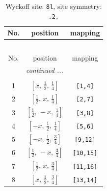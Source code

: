 \documentclass[fleqn,8pt]{jsarticle}
\begin{document}
\begin{longtable}{ccc}
\caption{Wyckoff site: {\tt 8l}, site symmetry: {\tt .2.}}
 \\
 \hline \hline
No. & position & mapping \\ \hline \endfirsthead

\multicolumn{2}{l}{\tablename\ \thetable{}} \\
 \hline \hline
No. & position & mapping \\ \hline \endhead

 \hline \hline
\multicolumn{2}{r}{\footnotesize\it continued ...} \\ \endfoot

 \hline \hline
\multicolumn{2}{r}{} \\ \endlastfoot

1 & $\left[ x,\, \frac{1}{2},\, \frac{1}{4} \right]$ & {\tt [1,4]} \\ \hline
2 & $\left[ \frac{1}{2},\, x,\, \frac{1}{4} \right]$ & {\tt [2,7]} \\ \hline
3 & $\left[ \frac{1}{2},\, - x,\, \frac{1}{4} \right]$ & {\tt [3,8]} \\ \hline
4 & $\left[ - x,\, \frac{1}{2},\, \frac{1}{4} \right]$ & {\tt [5,6]} \\ \hline
5 & $\left[ - x,\, \frac{1}{2},\, \frac{3}{4} \right]$ & {\tt [9,12]} \\ \hline
6 & $\left[ \frac{1}{2},\, - x,\, \frac{3}{4} \right]$ & {\tt [10,15]} \\ \hline
7 & $\left[ \frac{1}{2},\, x,\, \frac{3}{4} \right]$ & {\tt [11,16]} \\ \hline
8 & $\left[ x,\, \frac{1}{2},\, \frac{3}{4} \right]$ & {\tt [13,14]} \\
\end{longtable}
\renewcommand{\arraystretch}{1.2}
\end{document}
